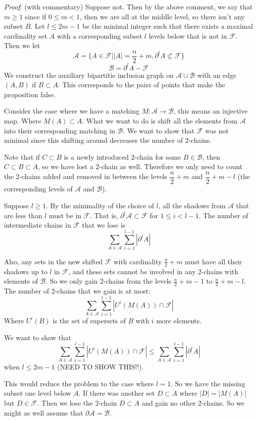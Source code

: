 \documentclass[11pt]{article}
\newcommand{\F}{\mathcal{F}}
\newcommand{\A}{\mathcal{A}}
\newcommand{\B}{\mathcal{B}}
\begin{document}
\textit{Proof}: (with commentary) Suppose not. Then by the above comment, we say that $m\geq 1$ since if $0\leq m<1$, then we are all at the middle level, so there isn't any subset $B$. Let $l \leq 2m - 1$ be the minimal integer such that there exists a maximal cardinality set $A$ with a corresponding subset $l$ levels below that is not in $\F$. Then we let 
\[ \A = \{ A \in \F | |A| = \dfrac{n}{2} + m, \partial^lA \not\subset \F \} \]
\[ \B = \partial^lA - \F \]
We construct the auxiliary bipartitie inclusion graph on $\A \cup \B$ with an edge $(A, B)$ if $B \subset A$. This corresponds to the pairs of points that make the proposition false. 

Consider the case where we have a matching $M: \A \rightarrow \B$, this means an injective map. Where $M(A) \subset A$. What we want to do is shift all the elements from $\A$ into their corresponding matching in $\B$. We want to show that $\F$ was not minimal since this shifting around decreases the number of 2-chains. 

Note that if $C \subset B$ is a newly introduced 2-chain for some $B \in \B$, then $C \subset B \subset A$, so we have lost a 2-chain as well. Therefore we only need to count the 2-chains added and removed in between the levels $\dfrac{n}{2} + m$ and $\dfrac{n}{2} + m - l$ (the corresponding levels of $\A$ and $\B$). 

Suppose $l \geq 1$. By the minimality of the choice of $l$, all the shadows from $\A$ that are less than $l$ must be in $\F$. That is, $\partial^i\A \subset \F$ for $1 \leq i < l-1$. The number of intermediate chains in $\F$ that we lose is
\[ \sum_{A \in \A} \sum_{i=1}^{l-1} |\partial^i A| \]

Also, any sets in the new shifted $\F$ with cardinality $\frac{n}{2} + m$ must have all their shadows up to $l$ in $\F$, and these sets cannot be involved in any 2-chains with elements of $\B$. So we only gain 2-chains from the levels $\frac{n}{2}+m-1$ to $\frac{n}{2}+m-l$. The number of 2-chains that we gain is at most:
\[ \sum_{A \in \A} \sum_{i=1}^{l-1} |U^i(M(A)) \cap \F| \]
Where $U^i(B)$ is the set of supersets of $B$ with $i$ more elements.

We want to show that \[ \sum_{A \in \A} \sum_{i=1}^{l-1} |U^i(M(A)) \cap \F| \leq  \sum_{A \in \A} \sum_{i=1}^{l-1} |\partial^i A| \] when $l \leq 2m-1$ (NEED TO SHOW THIS!!).

This would reduce the problem to the case where $l=1$. So we have the missing subset one level below $A$. If there was another set $D \subset A$ where $|D| = |M(A)|$ but $D \in \F$. Then we lose the 2-chain $D \subset A$ and gain no other 2-chains. So we might as well assume that $\partial \A = \B$. 
\end{document}
